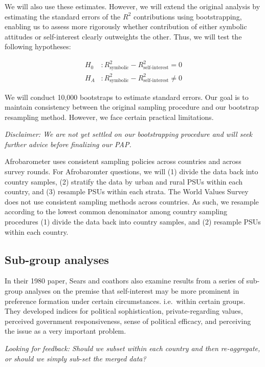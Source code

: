 \documentclass[]{article}
\begin{document}
We will also use these estimates. However, we will extend the original
analysis by estimating the standard errors of the \(R^2\) contributions
using bootstrapping, enabling us to assess more rigorously whether
contribution of either symbolic attitudes or self-interest clearly
outweights the other. Thus, we will test the following hypotheses:

\[\begin{aligned}
H_0 \ &: R^2_{\text{symbolic}} - R^2_{\text{self-interest}} = 0\\ H_A&: R^2_{\text{symbolic}} - R^2_{\text{self-interest}} \neq 0
\end{aligned}\]

We will conduct 10,000 bootstraps to estimate standard errors. Our goal
is to maintain consistency between the original sampling procedure and
our bootstrap resampling method. However, we face certain practical
limitations.

\textit{Disclaimer: We are not yet settled on our bootstrapping procedure and will seek further advice before finalizing our PAP.}

Afrobarometer uses consistent sampling policies across countries and
across survey rounds. For Afrobaromter questions, we will (1) divide the
data back into country samples, (2) stratify the data by urban and rural
PSUs within each country, and (3) resample PSUs within each strata. The
World Values Survey does not use consistent sampling methods across
countries. As such, we resample according to the lowest common
denominator among country sampling procedures (1) divide the data back
into country samples, and (2) resample PSUs within each country.

\subsection{Sub-group analyses}\label{sub-group-analyses}

In their 1980 paper, Sears and coathors also examine results from a
series of sub-group analyses on the premise that self-interest may be
more prominent in preference formation under certain circumstances.
i.e.~within certain groups. They developed indices for political
sophistication, private-regarding values, perceived government
responsiveness, sense of political efficacy, and perceiving the issue as
a very important problem.

\textit{Looking for feedback: Should we subset within each country and then re-aggregate, or should we simply sub-set the merged data?}
\end{document}
